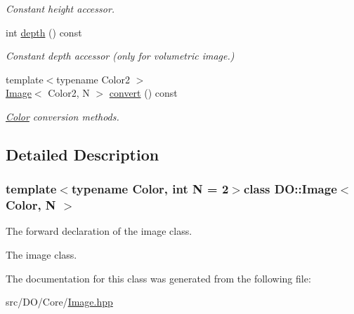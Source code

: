 \begin{DoxyCompactItemize}
\begin{DoxyCompactList}\small\item\em Constant height accessor. \end{DoxyCompactList}\item 
\hypertarget{class_d_o_1_1_image_a3275d1392d01b26af1c8cd52b0d10745}{int \hyperlink{class_d_o_1_1_image_a3275d1392d01b26af1c8cd52b0d10745}{depth} () const }\label{class_d_o_1_1_image_a3275d1392d01b26af1c8cd52b0d10745}

\begin{DoxyCompactList}\small\item\em Constant depth accessor (only for volumetric image.) \end{DoxyCompactList}\item 
\hypertarget{class_d_o_1_1_image_a3b35c07b31609437c194be2614e2e594}{{\footnotesize template$<$typename Color2 $>$ }\\\hyperlink{class_d_o_1_1_image}{Image}$<$ Color2, N $>$ \hyperlink{class_d_o_1_1_image_a3b35c07b31609437c194be2614e2e594}{convert} () const }\label{class_d_o_1_1_image_a3b35c07b31609437c194be2614e2e594}

\begin{DoxyCompactList}\small\item\em \hyperlink{class_d_o_1_1_color}{Color} conversion methods. \end{DoxyCompactList}\end{DoxyCompactItemize}


\subsection{Detailed Description}
\subsubsection*{template$<$typename Color, int N = 2$>$class D\-O\-::\-Image$<$ Color, N $>$}

The forward declaration of the image class. 

The image class. 

The documentation for this class was generated from the following file\-:\begin{DoxyCompactItemize}
\item 
src/\-D\-O/\-Core/\hyperlink{_image_8hpp}{Image.\-hpp}\end{DoxyCompactItemize}
